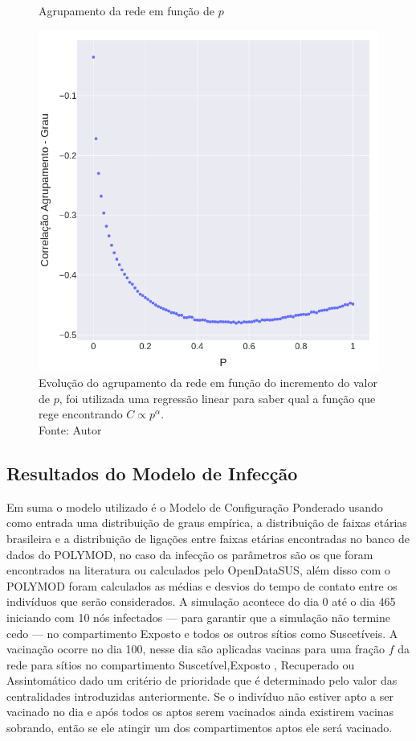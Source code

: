 \begin{figure}[H]
    \centering
    \captionsetup{font=normalsize,skip=0.8pt,singlelinecheck=on,labelsep=endash}
    \caption{Agrupamento da rede em função de $p$}
    \includegraphics[scale= 0.5]{figuras/correlation.png}
    \captionsetup{font=small,justification=justified}    \caption*{Evolução do agrupamento da rede em função 
    do incremento do valor de $p$, foi utilizada uma regressão linear para saber qual a função que rege encontrando $C \propto p^{\alpha}$.\\Fonte: Autor}
    \label{fig:correlation}
\end{figure}

\subsection{Resultados do Modelo de Infecção}

Em suma o modelo utilizado é o Modelo de Configuração Ponderado usando como entrada uma distribuição de graus empírica, a distribuição de faixas etárias brasileira e a distribuição de ligações entre faixas etárias encontradas no banco de dados do POLYMOD, no caso da infecção os parâmetros são os que foram encontrados na literatura ou calculados pelo OpenDataSUS, além disso com o POLYMOD foram calculados as médias e desvios do tempo de contato entre os indivíduos que serão considerados. A simulação acontece do dia 0 até o dia 465 iniciando com 10 nós infectados — para garantir que a simulação não termine cedo — no compartimento Exposto e todos os outros sítios como Suscetíveis. A vacinação ocorre no dia 100, nesse dia são aplicadas vacinas para uma fração $f$ da rede para sítios no compartimento Suscetível,Exposto , Recuperado ou Assintomático dado um critério de prioridade que é determinado pelo valor das centralidades introduzidas anteriormente. Se o indivíduo não estiver apto a ser vacinado no dia e após todos os aptos serem vacinados ainda existirem vacinas sobrando, então se ele atingir um dos compartimentos aptos ele será vacinado.

